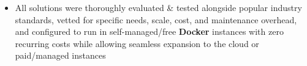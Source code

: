 \documentclass[10pt,a4paper,ragged2e]{altacv}
\begin{document}
\begin{fullwidth}
\begin{itemize}[label={}]
        



    \item All solutions were thoroughly evaluated \& tested alongside popular industry standards, vetted for specific needs, scale, cost, and maintenance overhead, and configured to run in self-managed/free \textbf{Docker} instances with zero recurring costs while allowing seamless expansion to the cloud or paid/managed instances


\end{itemize}
\end{fullwidth}
\end{document}
